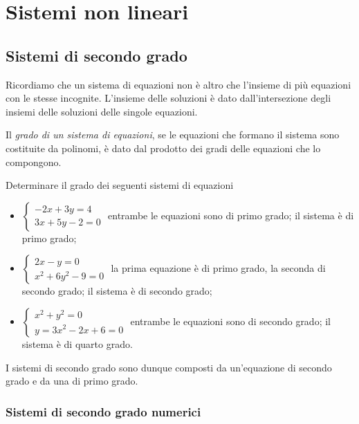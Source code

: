 
\chapter{Sistemi non lineari}
\section{Sistemi di secondo grado}
Ricordiamo che un sistema di equazioni non è altro che l'insieme di più 
equazioni con le stesse incognite. L'insieme delle soluzioni è dato 
dall'intersezione degli insiemi delle soluzioni delle singole equazioni.

\begin{definizione}{}{}
Il \emph{grado di un sistema di equazioni}, se le equazioni che formano il 
sistema sono costituite da polinomi, è dato dal prodotto dei gradi delle 
equazioni che lo compongono.
\end{definizione}

\begin{esempio}{}{}
Determinare il grado dei seguenti sistemi di equazioni

\begin{itemize}
\item \(\left\{\begin{array}{l}-2x+3y=4 \\3x+5y-2=0\end{array}\right.\) 
entrambe le equazioni sono di primo grado; il sistema è di primo grado;
\item \(\left\{\begin{array}{l}2x-y=0 \\x^2+6y^2-9=0\end{array}\right.\) 
la prima equazione è di primo grado, la seconda di secondo grado; 
il sistema è di secondo grado;
\item \(\left\{\begin{array}{l}x^2+y^2=0 \\y=3x^2-2x+6=0\end{array}\right.\) 
entrambe le equazioni sono di secondo grado; il sistema è di quarto grado.
\end{itemize}
\end{esempio}

I sistemi di secondo grado sono dunque composti da un'equazione di secondo 
grado e da una di primo grado.


\subsection{Sistemi di secondo grado numerici}

